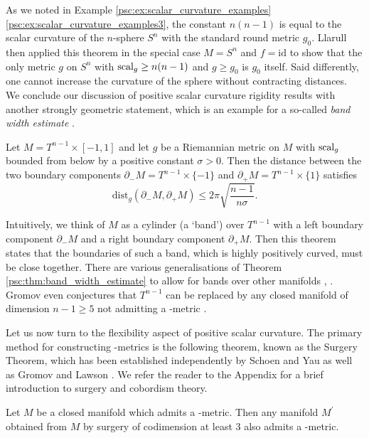 As we noted in Example \ref{psc:ex:scalar_curvature_examples} \ref{psc:ex:scalar_curvature_examples3}, the constant $n(n-1)$ is equal to the scalar curvature of the $n$-sphere $S^n$ with the standard round metric $g_0$. Llarull then applied this theorem in the special case $M = S^n$ and $f = \mathrm{id}$ to show that the only metric $g$ on $S^n$ with $\mathrm{scal}_g \geq n(n-1)$ and $g \geq g_0$ is $g_0$ itself. Said differently, one cannot increase the curvature of the sphere without contracting distances. We conclude our discussion of positive scalar curvature rigidity results with another strongly geometric statement, which is an example for a so-called \textit{band width estimate} \cite[p. 2]{gromov2018metric}. 

\begin{theorem}[Gromov, 2018]
    \label{psc:thm:band_width_estimate}
    Let $M = T^{n-1} \times [-1,1]$ and let $g$ be a Riemannian metric on $M$ with $\mathrm{scal}_g$ bounded from below by a positive constant $\sigma > 0$. Then the distance between the two boundary components $\partial_{-} M =T^{n-1} \times \{-1\}$ and $\partial_{+} M =T^{n-1} \times \{1\}$ satisfies
    \[
    \mathrm{dist}_g(\partial_{-}M, \partial_{+}M) \leq 2 \pi \sqrt{\frac{n-1}{n\sigma}}.
    \]
\end{theorem}

Intuitively, we think of $M$ as a cylinder (a `band') over $T^{n-1}$ with a left boundary component $\partial_{-} M$ and a right boundary component $\partial_{+} M$. Then this theorem states that the boundaries of such a band, which is highly positively curved, must be close together. There are various generalisations of Theorem \ref{psc:thm:band_width_estimate} to allow for bands over other manifolds \cite{zeidler2022band}, \cite{cecchini2024scalar}. Gromov even conjectures that $T^{n-1}$ can be replaced by any closed manifold of dimension $n-1 \geq 5$ not admitting a \psc-metric \cite[Conjecture C]{gromov2018metric}.

Let us now turn to the flexibility aspect of positive scalar curvature. The primary method for constructing \psc-metrics is the following theorem, known as the Surgery Theorem, which has been established independently by Schoen and Yau \cite[Cor. 6]{SchoenYau1979} as well as Gromov and Lawson \cite[Thm. A]{gromov_lawson_surgerytheorem}. We refer the reader to the Appendix for a brief introduction to surgery and cobordism theory.

\begin{theorem}
    \label{psc:thm:surgery_thm}
    Let $M$ be a closed manifold which admits a \psc-metric. Then any manifold $M^\prime$ obtained from $M$ by surgery of codimension at least $3$ also admits a \psc-metric.
\end{theorem}

